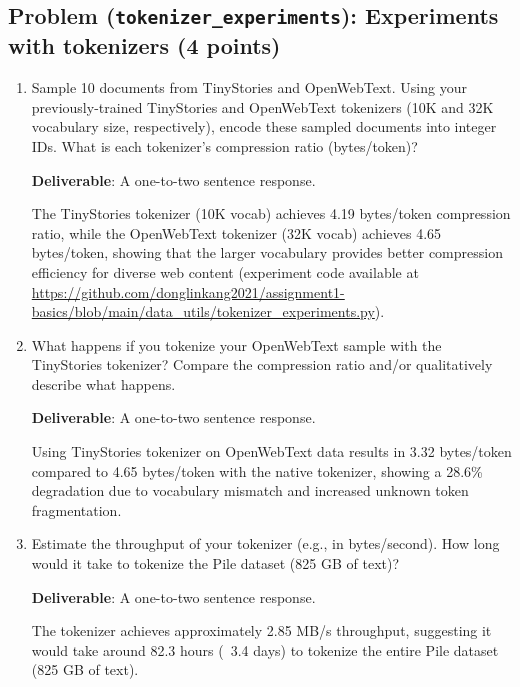\documentclass{article}
\newcounter{problem}
\newcommand{\problem}[2]{
    \stepcounter{problem}
    \subsection{Problem (\texttt{#1}): #2}
    \vspace{-1.5em} %
    \noindent
}
\begin{document}
\problem{tokenizer\_experiments}{Experiments with tokenizers (4 points)}

\begin{enumerate}[label=(\alph*)]
    \item Sample 10 documents from TinyStories and OpenWebText. Using your previously-trained TinyStories and OpenWebText tokenizers (10K and 32K vocabulary size, respectively), encode these sampled documents into integer IDs. What is each tokenizer's compression ratio (bytes/token)?
    
    \textbf{Deliverable}: A one-to-two sentence response.
    
    \begin{answer}
    The TinyStories tokenizer (10K vocab) achieves 4.19 bytes/token compression ratio, while the OpenWebText tokenizer (32K vocab) achieves 4.65 bytes/token, showing that the larger vocabulary provides better compression efficiency for diverse web content (experiment code available at \url{https://github.com/donglinkang2021/assignment1-basics/blob/main/data_utils/tokenizer_experiments.py}).
    \end{answer}

    \item What happens if you tokenize your OpenWebText sample with the TinyStories tokenizer? Compare the compression ratio and/or qualitatively describe what happens.

    \textbf{Deliverable}: A one-to-two sentence response.

    \begin{answer}
    Using TinyStories tokenizer on OpenWebText data results in 3.32 bytes/token compared to 4.65 bytes/token with the native tokenizer, showing a 28.6\% degradation due to vocabulary mismatch and increased unknown token fragmentation.
    \end{answer}

    \item Estimate the throughput of your tokenizer (e.g., in bytes/second). How long would it take to tokenize the Pile dataset (825 GB of text)?

    \textbf{Deliverable}: A one-to-two sentence response.

    \begin{answer}
    The tokenizer achieves approximately 2.85 MB/s throughput, suggesting it would take around 82.3 hours (~3.4 days) to tokenize the entire Pile dataset (825 GB of text).
    \end{answer}


\end{enumerate}
\end{document}
